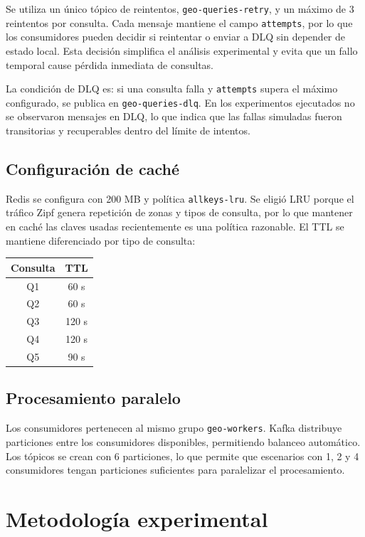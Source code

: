 \documentclass[11pt,letterpaper]{article}
\begin{document}
Se utiliza un único tópico de reintentos, \texttt{geo-queries-retry}, y un máximo de 3 reintentos por consulta. Cada mensaje mantiene el campo \texttt{attempts}, por lo que los consumidores pueden decidir si reintentar o enviar a DLQ sin depender de estado local. Esta decisión simplifica el análisis experimental y evita que un fallo temporal cause pérdida inmediata de consultas.

La condición de DLQ es: si una consulta falla y \texttt{attempts} supera el máximo configurado, se publica en \texttt{geo-queries-dlq}. En los experimentos ejecutados no se observaron mensajes en DLQ, lo que indica que las fallas simuladas fueron transitorias y recuperables dentro del límite de intentos.

\subsection{Configuración de caché}

Redis se configura con 200 MB y política \texttt{allkeys-lru}. Se eligió LRU porque el tráfico Zipf genera repetición de zonas y tipos de consulta, por lo que mantener en caché las claves usadas recientemente es una política razonable. El TTL se mantiene diferenciado por tipo de consulta:

\begin{center}
\begin{tabular}{cc}
\toprule
Consulta & TTL \\
\midrule
Q1 & 60 s \\
Q2 & 60 s \\
Q3 & 120 s \\
Q4 & 120 s \\
Q5 & 90 s \\
\bottomrule
\end{tabular}
\end{center}

\subsection{Procesamiento paralelo}

Los consumidores pertenecen al mismo grupo \texttt{geo-workers}. Kafka distribuye particiones entre los consumidores disponibles, permitiendo balanceo automático. Los tópicos se crean con 6 particiones, lo que permite que escenarios con 1, 2 y 4 consumidores tengan particiones suficientes para paralelizar el procesamiento.

\section{Metodología experimental}
\end{document}
